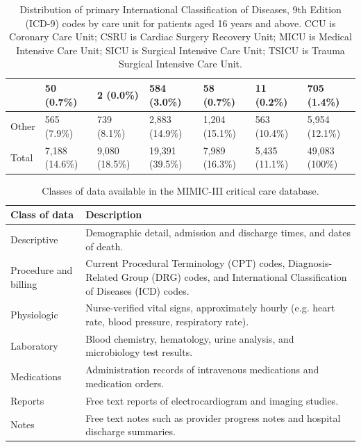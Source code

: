 \documentclass[english]{article}
\begin{document}
\begin{center}
\begin{table}
\begin{tabular}{|p{3.9cm}|p{1.25cm}|p{1.25cm}|p{1.25cm}|p{1.25cm}|p{1.25cm}|p{1.25cm}|}
    & 50 (0.7\%) & 2 (0.0\%) & 584 (3.0\%) & 58 (0.7\%) & 11 (0.2\%) & 705 (1.4\%) \\
    \hline
    Other & 565 (7.9\%) & 739 (8.1\%) & 2,883 (14.9\%) & 1,204 (15.1\%) & 563 (10.4\%) & 5,954 (12.1\%) \\
    \hline
    Total & 7,188 (14.6\%) & 9,080 (18.5\%) & 19,391 (39.5\%) & 7,989 (16.3\%) & 5,435 (11.1\%) & 49,083 (100\%) \\
    \hline
\end{tabular}
\caption{Distribution of primary International Classification of Diseases, 9th Edition (ICD-9) codes by care unit for patients aged 16 years and above. CCU is Coronary Care Unit; CSRU is Cardiac Surgery Recovery Unit; MICU is Medical Intensive Care Unit; SICU is Surgical Intensive Care Unit; TSICU is Trauma Surgical Intensive Care Unit.}
\label{table:icddistribution}
\end{table}
\end{center}


\begin{center}
\begin{table}
\begin{tabular}{|l|p{8cm}|}
    \hline
    Class of data & Description \\
    \hline
    Descriptive & Demographic detail, admission and discharge times, and dates of death. \\
    \hline
    Procedure and billing & Current Procedural Terminology (CPT) codes, Diagnosis-Related Group (DRG) codes, and International Classification of Diseases (ICD) codes. \\
    \hline
    Physiologic & Nurse-verified vital signs, approximately hourly (e.g. heart rate, blood pressure, respiratory rate). \\
    \hline
    Laboratory & Blood chemistry, hematology, urine analysis, and microbiology test results. \\
    \hline
    Medications & Administration records of intravenous medications and medication orders. \\
    \hline
    Reports & Free text reports of electrocardiogram and imaging studies. \\
    \hline
    Notes & Free text notes such as provider progress notes and hospital discharge summaries. \\
    \hline
\end{tabular}
\caption{Classes of data available in the MIMIC-III critical care database.}
\label{table:dataclasses}
\end{table}
\end{center}
\end{document}
